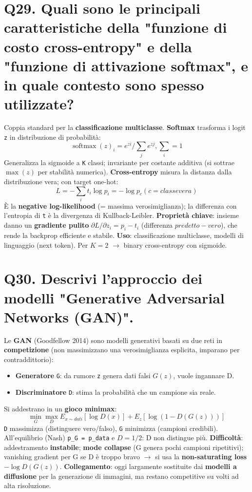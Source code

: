 \documentclass[11pt,a4paper]{article}
\begin{document}
\section*{Q29. Quali sono le principali caratteristiche della "funzione di costo cross-entropy" e della "funzione di attivazione softmax", e in quale contesto sono spesso utilizzate?}
Coppia standard per la \textbf{classificazione multiclasse}.
\textbf{Softmax} trasforma i logit \texttt{z} in distribuzione di probabilità:
\[ \operatorname{softmax}(z)_{i} = e^{zi} / \sum _{j} e^{zj},    \sum _{i} = 1 \]
Generalizza la sigmoide a \texttt{K} classi; invariante per costante additiva (si sottrae $\operatorname{max}(z)$ per stabilità numerica).
\textbf{Cross-entropy} misura la distanza dalla distribuzione vera; con target one-hot:
\[ L = - \sum _{i} t_{i} \operatorname{log} p_{i} = - \operatorname{log} p_c   (c = classe vera) \]
È la \textbf{negative log-likelihood} (= massima verosimiglianza); la differenza con l'entropia di \texttt{t} è la divergenza di Kullback-Leibler.
\textbf{Proprietà chiave}: insieme danno un \textbf{gradiente pulito} $\partial L/\partial z_{i} = p_{i} - t_{i}$ (differenza $predetto-vero$), che rende la backprop efficiente e stabile. \textbf{Uso}: classificazione multiclasse, modelli di linguaggio (next token). Per $K=2$ $\to $ binary cross-entropy con sigmoide.
\newpage
\section*{Q30. Descrivi l'approccio dei modelli "Generative Adversarial Networks (GAN)".}
Le \textbf{GAN} (Goodfellow 2014) sono modelli generativi basati su due reti in \textbf{competizione} (non massimizzano una verosimiglianza esplicita, imparano per contraddittorio):
\begin{itemize}
\item \textbf{Generatore} \texttt{G}: da rumore \texttt{z} genera dati falsi $G(z)$, vuole ingannare D.
\item \textbf{Discriminatore} \texttt{D}: stima la probabilità che un campione sia reale.
\end{itemize}
Si addestrano in un \textbf{gioco minimax}:
\[ \operatorname{min}_G \operatorname{max}_D  E_{x\sim dati}[\operatorname{log} D(x)] + E_{z}[\operatorname{log}(1 - D(G(z)))] \]
\texttt{D} massimizza (distinguere vero/falso), \texttt{G} minimizza (campioni credibili). All'equilibrio (Nash) \texttt{p\_G = p\_data} e $D = 1/2$: D non distingue più.
\textbf{Difficoltà}: addestramento \textbf{instabile}; \textbf{mode collapse} (G genera pochi campioni ripetitivi); vanishing gradient per G se D è troppo bravo $\to $ si usa la \textbf{non-saturating loss} $-\operatorname{log} D(G(z))$.
\textbf{Collegamento}: oggi largamente sostituite dai \textbf{modelli a diffusione} per la generazione di immagini, ma restano competitive su volti ad alta risoluzione.
\newpage
\end{document}
